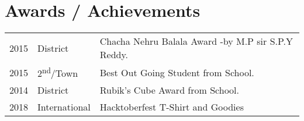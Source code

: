 \documentclass[]{deedy-resume-openfont}
\begin{document}
\begin{minipage}[t]{0.66\textwidth}


\section{Awards / Achievements} 
\begin{tabular}{rll}
2015	     & District  & Chacha Nehru Balala Award -by M.P sir S.P.Y Reddy.\\
2015	     & 2\textsuperscript{nd}/Town  & Best Out Going Student from School.\\
2014	     & District  & Rubik's Cube Award from School.\\
2018        & International & Hacktoberfest T-Shirt and Goodies\\
\end{tabular}
\sectionsep




\end{minipage} 
\end{document}
